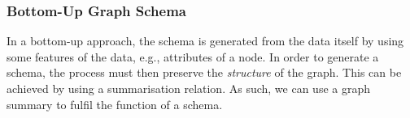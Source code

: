 \subsubsection{Bottom-Up Graph Schema}

In a bottom-up approach, the schema is generated from the data itself by using some features of the data, e.g., attributes of a node. In order to generate a schema, the process must then preserve the \emph{structure} of the graph. %
This can be achieved by using a summarisation relation. As such, we can use a graph summary to fulfil the function of a schema.



